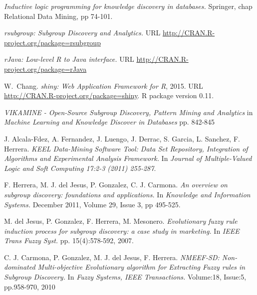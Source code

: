 \documentclass[]{article}
\begin{document}
\begin{thebibliography}{20}


\newblock \emph{Inductive logic programming for knowledge discovery in databases. }
\newblock Springer, chap Relational Data Mining, pp 74-101.

\newblock \emph{rsubgroup: Subgroup Discovery and Analytics.}
\newblock URL \url{http://CRAN.R-project.org/package=rsubgroup}

\newblock \emph{rJava: Low-level R to Java interface.}
\newblock URL \url{http://CRAN.R-project.org/package=rJava}

W.~Chang.
\newblock \emph{shiny: Web Application Framework for R}, 2015.
\newblock URL \url{http://CRAN.R-project.org/package=shiny}.
\newblock R package version 0.11.

\newblock \emph{VIKAMINE - Open-Source Subgroup Discovery, Pattern Mining and Analytics}
\newblock in \emph{Machine Learning and Knowledge Discover in Databases}
\newblock pp. 842-845

\newblock J. Alcala-Fdez, A. Fernandez, J. Luengo, J. Derrac, S. Garcia, L. Sanchez, F. Herrera.
\newblock \emph{KEEL Data-Mining Software Tool: Data Set Repository, Integration of Algorithms and Experimental Analysis Framework.}
\newblock In \emph{ Journal of Multiple-Valued Logic and Soft Computing 17:2-3 (2011) 255-287}.

\newblock F. Herrera, M. J. del Jesus, P. Gonzalez, C. J. Carmona.
\newblock \emph{An overview on subgroup discovery: foundations and applications.}
\newblock In \emph{Knowledge and Information Systems.}
\newblock December 2011, Volume 29, Issue 3, pp 495-525.

\newblock M. del Jesus, P. Gonzalez, F. Herrera, M. Mesonero.
\newblock \emph{Evolutionary fuzzy rule induction process for subgroup discovery: a case study in marketing.}
\newblock In \emph{IEEE Trans Fuzzy Syst.} pp. 15(4):578-592, 2007.

\newblock C. J. Carmona, P. Gonzalez, M. J. del Jesus, F. Herrera.
\newblock \emph{NMEEF-SD: Non-dominated Multi-objective Evolutionary algorithm for Extracting Fuzzy rules in Subgroup Discovery.}
\newblock In \emph{Fuzzy Systems, IEEE Transactions.}
\newblock Volume:18, Issue:5, pp.958-970, 2010


\end{thebibliography}
\end{document}
